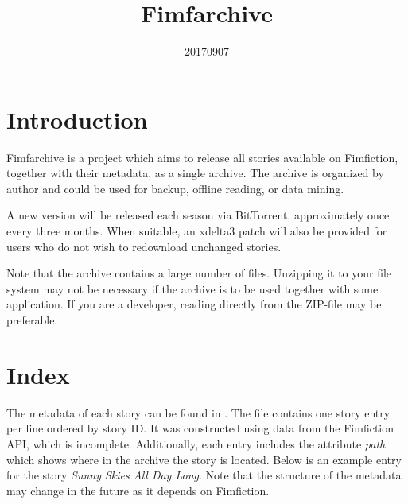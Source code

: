 \documentclass[hidelinks,a4paper,12pt]{article}
\begin{document}
\title{Fimfarchive}
\date{20170907}

\maketitle
\newpage
\tableofcontents
\newpage

\section{Introduction} \label{sec:introduction}

Fimfarchive is a project which aims to release all stories available on Fimfiction, together with their metadata, as a single archive. The archive is organized by author and could be used for backup, offline reading, or data mining.

A new version will be released each season via BitTorrent, approximately once every three months. When suitable, an xdelta3 patch will also be provided for users who do not wish to redownload unchanged stories.

Note that the archive contains a large number of files. Unzipping it to your file system may not be necessary if the archive is to be used together with some application. If you are a developer, reading directly from the ZIP-file may be preferable.


\section{Index} \label{sec:index}

The metadata of each story can be found in . The file contains one story entry per line ordered by story ID. It was constructed using data from the Fimfiction API, which is incomplete. Additionally, each entry includes the attribute \emph{path} which shows where in the archive the story is located. Below is an example entry for the story \emph{Sunny Skies All Day Long}. Note that the structure of the metadata may change in the future as it depends on Fimfiction.
\end{document}
